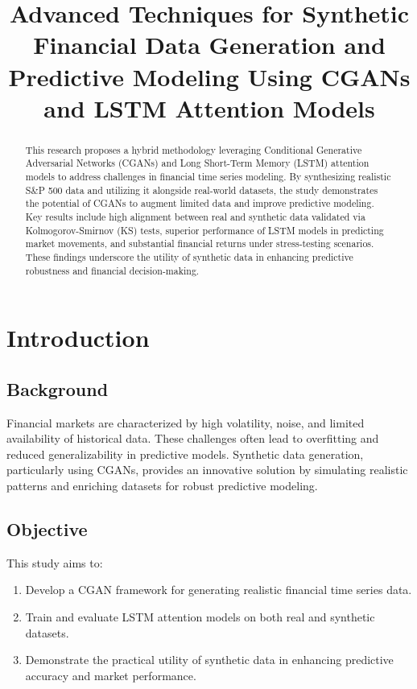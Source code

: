 \documentclass[conference]{IEEEtran}
\begin{document}
\title{Advanced Techniques for Synthetic Financial Data Generation and Predictive Modeling Using CGANs and LSTM Attention Models}

 

\maketitle

\begin{abstract}
This research proposes a hybrid methodology leveraging Conditional Generative Adversarial Networks (CGANs) and Long Short-Term Memory (LSTM) attention models to address challenges in financial time series modeling. By synthesizing realistic S&P 500 data and utilizing it alongside real-world datasets, the study demonstrates the potential of CGANs to augment limited data and improve predictive modeling. Key results include high alignment between real and synthetic data validated via Kolmogorov-Smirnov (KS) tests, superior performance of LSTM models in predicting market movements, and substantial financial returns under stress-testing scenarios. These findings underscore the utility of synthetic data in enhancing predictive robustness and financial decision-making.
\end{abstract}

\section{Introduction}
\subsection{Background}
Financial markets are characterized by high volatility, noise, and limited availability of historical data. These challenges often lead to overfitting and reduced generalizability in predictive models. Synthetic data generation, particularly using CGANs, provides an innovative solution by simulating realistic patterns and enriching datasets for robust predictive modeling.

\subsection{Objective}
This study aims to:
\begin{enumerate}
    \item Develop a CGAN framework for generating realistic financial time series data.
    \item Train and evaluate LSTM attention models on both real and synthetic datasets.
    \item Demonstrate the practical utility of synthetic data in enhancing predictive accuracy and market performance.
\end{enumerate}
\end{document}
